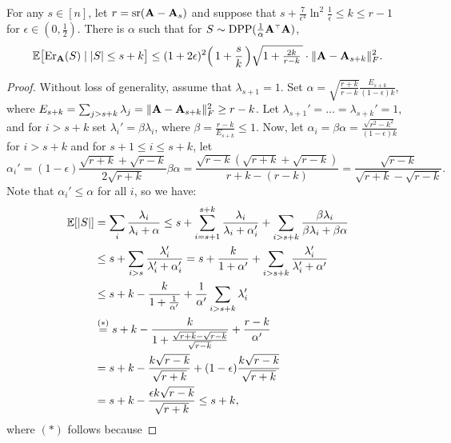 \documentclass{article}
\begin{document}
    \begin{theorem}
    	\label{t:upperbound_withs}
      For any $s\in[n]$, let $r={\mathrm{sr}}(\mathbf A-\mathbf A_s)$ and suppose that
      $s+\frac7{\epsilon^4}\ln^2\frac1\epsilon\leq k\leq r-1$ for $\epsilon\in(0,\frac12)$.
      There is $\alpha$ such that for 
    $S\sim\DPP(\frac1\alpha\A^\top\A)$,
    \begin{align*}
\mathbb E\big[\mathrm{Er}_\mathbf A(S) \mid |S|\leq s+k\big] \leq
      (1+2\epsilon)^2\Big(\,1+\frac{s}{k}\,\Big)\sqrt{1+\tfrac{2k}{r-k}\,}\cdot\|\mathbf A-\mathbf A_{s+k}\|_F^2.
    \end{align*}
  \end{theorem}
  \begin{proof}
      Without loss of generality, assume that $\lambda_{s+1}=1$. Set
    $\alpha=\sqrt{\frac{r+k}{r-k}}\frac{E_{s+k}}{(1-\epsilon)k}$, where
    $E_{s+k}=\sum_{j>s+k}\lambda_j=\|\mathbf A-\mathbf A_{s+k}\|_F^2\geq r-k$. Let 
    $\lambda_{s+1}'=...=\lambda_{s+k}'=1$, and for $i>s+k$ set
    $\lambda_i'=\beta\lambda_i$, where $\beta =
    \frac{r-k}{E_{s+k}}\leq 1$. Now, let
    $\alpha_{i}=\beta\alpha=\frac{\sqrt{r^2-k^2}}{(1-\epsilon)k}$
for $i>s+k$    and for $s+1\leq i\leq s+k$, let
    \[\alpha_{i}'=(1-\epsilon)\frac{\sqrt{r+k}+\sqrt{r-k}}{2\sqrt{r+k}}\beta\alpha
    =\frac{\sqrt{r-k}(\sqrt{r+k}+\sqrt{r-k})}{r+k - (r-k)} = \frac{\sqrt{r-k}}{\sqrt{r+k}-\sqrt{r-k}}.\]
Note that $\alpha_i'\leq \alpha$ for all $i$, so we have:
  \begin{align*}
    \mathbb E[|S|] &= \sum_{i}\frac{\lambda_i}{\lambda_i+\alpha} 
   \leq s + \sum_{i=s+1}^{s+k}\frac{\lambda_i}{\lambda_i+\alpha_i'}
    + \sum_{i>s+k}\frac{\beta\lambda_i}{\beta\lambda_i+\beta\alpha}\\
&   \leq s + \sum_{i>s} \frac{\lambda_i'}{\lambda_i'+\alpha_i'}
=s + \frac{k}{1+\alpha'} + \sum_{i>s+k}\frac{\lambda_i'}{\lambda_i'+\alpha'}\\
    &\leq s+
k - \frac {k}{1+\frac1{\alpha'}}+  \frac1{\alpha'} \sum_{i>s+k} \lambda_i' \\
    &\overset{(*)}{=} s + k - \frac{k}{1+\frac{\sqrt{r+k}-\sqrt{r-k}}{\sqrt{r-k}}}
      +\frac{r-k}{\alpha'}\\
                &=s + k - \frac{k\sqrt{r-k}}{\sqrt{r+k}}+
                  (1-\epsilon)\frac{k\sqrt{r-k}}{\sqrt{r+k}}\\
            &= s + k - \frac{\epsilon k\sqrt{r-k}}{\sqrt{r+k}}
              \leq s+k,
  \end{align*}
    where $(*)$ follows because

\end{proof}
\end{document}
